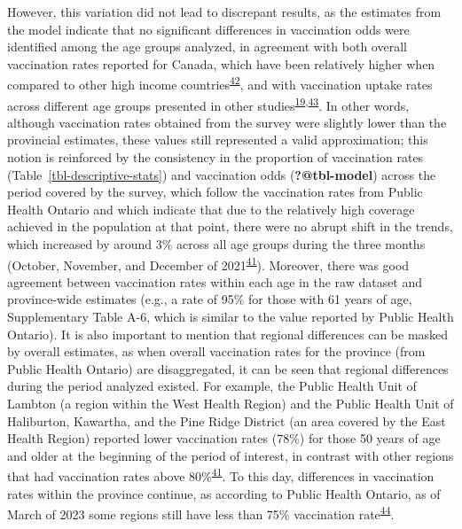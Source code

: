 \documentclass[
  letterpaper,
  DIV=11,
  numbers=noendperiod]{scrartcl}
\begin{document}
However, this variation did not lead to discrepant results, as the
estimates from the model indicate that no significant differences in
vaccination odds were identified among the age groups analyzed, in
agreement with both overall vaccination rates reported for Canada, which
have been relatively higher when compared to other high income
countries\textsuperscript{\protect\hyperlink{ref-dube2022}{42}}, and
with vaccination uptake rates across different age groups presented in
other
studies\textsuperscript{\protect\hyperlink{ref-guay2022}{19},\protect\hyperlink{ref-macdonald2021}{43}}.
In other words, although vaccination rates obtained from the survey were
slightly lower than the provincial estimates, these values still
represented a valid approximation; this notion is reinforced by the
consistency in the proportion of vaccination rates
(Table~\ref{tbl-descriptive-stats}) and vaccination odds
(\textbf{?@tbl-model}) across the period covered by the survey, which
follow the vaccination rates from Public Health Ontario and which
indicate that due to the relatively high coverage achieved in the
population at that point, there were no abrupt shift in the trends,
which increased by around 3\% across all age groups during the three
months (October, November, and December of
2021\textsuperscript{\protect\hyperlink{ref-ontario-covid}{41}}).
Moreover, there was good agreement between vaccination rates within each
age in the raw dataset and province-wide estimates (e.g., a rate of 95\%
for those with 61 years of age, Supplementary Table A-6, which is
similar to the value reported by Public Health Ontario). It is also
important to mention that regional differences can be masked by overall
estimates, as when overall vaccination rates for the province (from
Public Health Ontario) are disaggregated, it can be seen that regional
differences during the period analyzed existed. For example, the Public
Health Unit of Lambton (a region within the West Health Region) and the
Public Health Unit of Haliburton, Kawartha, and the Pine Ridge District
(an area covered by the East Health Region) reported lower vaccination
rates (78\%) for those 50 years of age and older at the beginning of the
period of interest, in contrast with other regions that had vaccination
rates above
80\%\textsuperscript{\protect\hyperlink{ref-ontario-covid}{41}}. To this
day, differences in vaccination rates within the province continue, as
according to Public Health Ontario, as of March of 2023 some regions
still have less than 75\% vaccination
rate\textsuperscript{\protect\hyperlink{ref-ontario-covid-map}{44}}.
\end{document}
